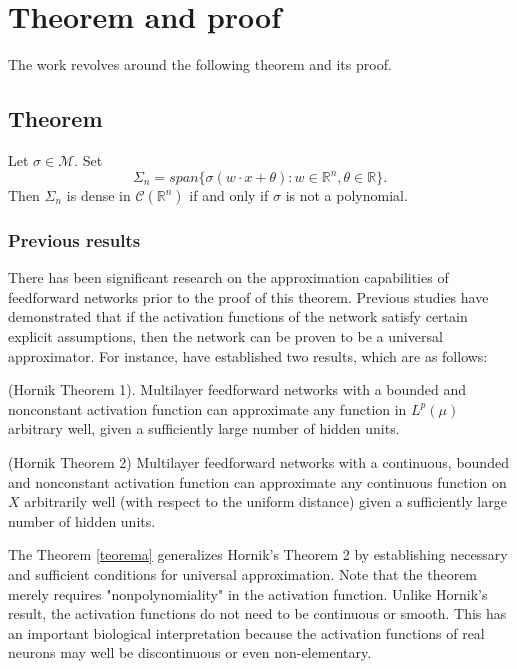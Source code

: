 \documentclass[../main.tex]{subfiles}
\begin{document}
	

	\chapter{Theorem and proof} \label{ch:proof}
\noindent  The work revolves around the following theorem and its proof. 
	\section{Theorem}
	\begin{theorem} Let $ \sigma \in  \mathcal{M}$. Set
		$$ \Sigma_n = span\{\sigma(w\cdot x + \theta) : w\in \mathbb{R}^n, \theta \in \mathbb{R} \}.$$
		Then $\Sigma_n$ is dense in $\mathcal{C}(\mathbb{R}^n)$ if and only if $\sigma$ is not a polynomial. 
	\label{teorema}
	\end{theorem}


\subsection{Previous results}
\noindent  There has been significant research on the approximation capabilities of feedforward networks prior to the proof of this theorem. Previous studies have demonstrated that if the activation functions of the network satisfy certain explicit assumptions, then the network can be proven to be a universal approximator. For instance, \cite{HORNIK1991251} have established two results, which are as follows:

\begin{theorem} (Hornik Theorem 1). Multilayer feedforward networks with a bounded and nonconstant activation function can approximate any function in $L^p(\mu)$ arbitrary well, given a sufficiently large number of hidden units. 
\end{theorem}

\begin{theorem} (Hornik Theorem 2) Multilayer feedforward networks with a continuous, bounded and nonconstant activation function can approximate any continuous function on $X$ arbitrarily well (with respect to the uniform distance) given a sufficiently large number of hidden units. 
\end{theorem}

\noindent
The Theorem \ref{teorema} generalizes Hornik's Theorem 2 by establishing necessary and sufficient conditions for universal approximation. Note that the theorem merely requires "nonpolynomiality" in the activation function. Unlike Hornik's result, the activation functions do not need to be continuous or smooth. This has an important biological interpretation because the activation functions of real neurons may well be discontinuous or even non-elementary.
\end{document}
